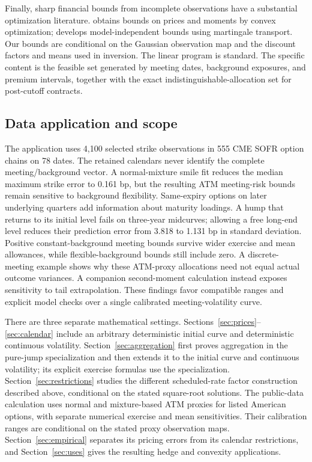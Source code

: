 Finally, sharp financial bounds from incomplete observations have a substantial optimization literature. \citet{bertsimas2002relation} obtains bounds on prices and moments by convex optimization; \citet{beiglbock2011model} develops model-independent bounds using martingale transport. Our bounds are conditional on the Gaussian observation map and the discount factors and means used in inversion. The linear program is standard. The specific content is the feasible set generated by meeting dates, background exposures, and premium intervals, together with the exact indistinguishable-allocation set for post-cutoff contracts.

\subsection{Data application and scope}
The application uses 4,100 selected strike observations in 555 CME SOFR option chains on 78 dates. The retained calendars never identify the complete meeting/background vector. A normal-mixture smile fit reduces the median maximum strike error to 0.161 bp, but the resulting ATM meeting-risk bounds remain sensitive to background flexibility. Same-expiry options on later underlying quarters add information about maturity loadings. A hump that returns to its initial level fails on three-year midcurves; allowing a free long-end level reduces their prediction error from 3.818 to 1.131 bp in standard deviation. Positive constant-background meeting bounds survive wider exercise and mean allowances, while flexible-background bounds still include zero. A discrete-meeting example shows why these ATM-proxy allocations need not equal actual outcome variances. A companion second-moment calculation instead exposes sensitivity to tail extrapolation. These findings favor compatible ranges and explicit model checks over a single calibrated meeting-volatility curve.

There are three separate mathematical settings. Sections~\ref{sec:prices}--\ref{sec:calendar} include an arbitrary deterministic initial curve and deterministic continuous volatility. Section~\ref{sec:aggregation} first proves aggregation in the pure-jump specialization and then extends it to the initial curve and continuous volatility; its explicit exercise formulas use the specialization. Section~\ref{sec:restrictions} studies the different scheduled-rate factor construction described above, conditional on the stated square-root solutions. The public-data calculation uses normal and mixture-based ATM proxies for listed American options, with separate numerical exercise and mean sensitivities. Their calibration ranges are conditional on the stated proxy observation maps. Section~\ref{sec:empirical} separates its pricing errors from its calendar restrictions, and Section~\ref{sec:uses} gives the resulting hedge and convexity applications.
